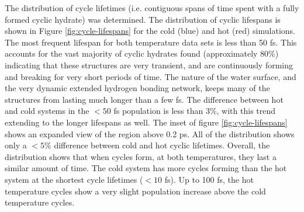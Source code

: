 \documentclass{article}
\begin{document}



The distribution of cycle lifetimes (i.e. contiguous spans of time spent with a fully formed cyclic hydrate) was determined. The distribution of cyclic lifespans is shown in Figure \ref{fig:cycle-lifespans} for the cold (blue) and hot (red) simulations. The most frequent lifespan for both temperature data sets is less than 50 fs. This accounts for the vast majority of cyclic hydrates found (approximately 80\%) indicating that these structures are very transient, and are continuously forming and breaking for very short periods of time. The nature of the water surface, and the very dynamic extended hydrogen bonding network, keeps many of the structures from lasting much longer than a few fs. The difference between hot and cold systems in the $<50$ fs population is less than 3\%, with this trend extending to the longer lifespans as well. The inset of figure \ref{fig:cycle-lifespans} shows an expanded view of the region above 0.2 ps. All of the distribution shows only a $<5$\% difference between cold and hot cyclic lifetimes. Overall, the distribution shows that when cycles form, at both temperatures, they last a similar amount of time. The cold system has more cycles forming than the hot system at the shortest cycle lifetimes ($<10$ fs). Up to 100 fs, the hot temperature cycles show a very slight population increase above the cold temperature cycles.
\end{document}
